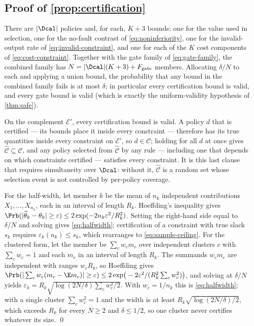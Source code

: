 \subsection{Proof of \texorpdfstring{\cref{prop:certification}}{the certification proposition}}

There are $|\Dcal|$ policies and, for each, $K+3$ bounds: one for the value used
in selection, one for the no-fault contrast of \eqref{eq:noninferiority}, one
for the invalid-output rate of \eqref{eq:invalid-constraint}, and one for each of
the $K$ cost components of \eqref{eq:cost-constraint}.  Together with the gate
family of \eqref{eq:gate-family}, the combined family has $N=|\Dcal|(K+3)+F_{\mathrm{gate}}$
members.  Allocating $\delta/N$ to each and applying a union bound, the
probability that any bound in the combined family fails is at most $\delta$;
in particular every certification bound is valid, and every gate bound is valid
(which is exactly the uniform-validity hypothesis of \cref{thm:safe}).

On the complement $\mathcal E'$, every certification bound is valid.  A policy
$d$ that is certified --- its bounds place it inside every constraint ---
therefore has its true quantities inside every constraint on $\mathcal E'$, so
$d\in\mathcal C$; holding for all $d$ at once gives
$\widehat{\mathcal C}\subseteq\mathcal C$, and any policy selected from
$\widehat{\mathcal C}$ by any rule --- including one that depends on which
constraints certified --- satisfies every constraint.  It is this last clause
that requires simultaneity over $\Dcal$: without it, $\widehat{\mathcal C}$ is a
random set whose selection event is not controlled by per-policy coverage.

For the half-width, let member $k$ be the mean of $n_k$ independent
contributions $X_1,\dots,X_{n_k}$, each in an interval of length $R_k$.
Hoeffding's inequality gives
$\Prb(|\widehat\theta_k-\theta_k|\ge\varepsilon)\le
2\exp(-2n_k\varepsilon^2/R_k^2)$.  Setting the right-hand side equal to
$\delta/N$ and solving gives \eqref{eq:halfwidth}; certification of a
constraint with true slack $s_k$ requires $\varepsilon_k(n_k)\le s_k$, which
rearranges to \eqref{eq:sample-ceiling}.  For the clustered form, let the
member be $\sum_c w_c m_c$ over independent clusters $c$ with $\sum_c w_c=1$
and each $m_c$ in an interval of length $R_k$.  The summands $w_cm_c$ are
independent with ranges $w_cR_k$, so Hoeffding gives
$\Prb(|\sum_c w_c(m_c-\E m_c)|\ge\varepsilon)\le
2\exp\!\big(-2\varepsilon^2/(R_k^2\sum_c w_c^2)\big)$, and solving at
$\delta/N$ yields $\varepsilon_k=R_k\sqrt{\log(2N/\delta)\sum_cw_c^2/2}$.  With
$w_c=1/n_k$ this is \eqref{eq:halfwidth}; with a single cluster
$\sum_cw_c^2=1$ and the width is at least $R_k\sqrt{\log(2N/\delta)/2}$, which
exceeds $R_k$ for every $N\ge 2$ and $\delta\le 1/2$, so one cluster never
certifies whatever its size. \qed

